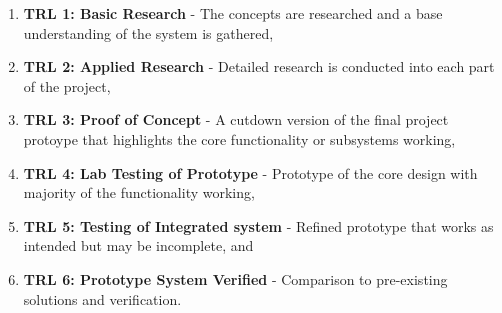 \begin{enumerate}
    \item \textbf{TRL 1: Basic Research} - The concepts are researched and a base understanding of the system is gathered,
    \item \textbf{TRL 2: Applied Research} - Detailed research is conducted into each part of the project,
    \item \textbf{TRL 3: Proof of Concept} - A cutdown version of the final project protoype that highlights the core functionality or subsystems working,
    \item \textbf{TRL 4: Lab Testing of Prototype} - Prototype of the core design with majority of the functionality working,
    \item \textbf{TRL 5: Testing of Integrated system} - Refined prototype that works as intended but may be incomplete, and
    \item \textbf{TRL 6: Prototype System Verified} - Comparison to pre-existing solutions and verification. 
\end{enumerate}


